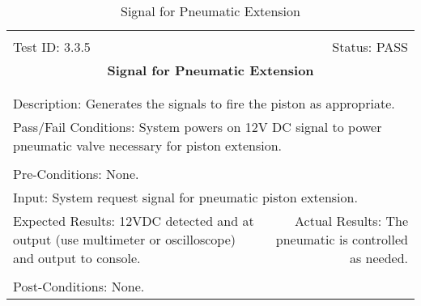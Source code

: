 \documentclass[titlepage]{article}
\begin{document}
\begin{center}
\begin{table}[h!]
\begin{tabular}{|l r|}\hline&\\[-2mm]
	Test ID: 3.3.5	&Status: PASS\\[-3mm]
	\multicolumn{2}{|c|}{\textbf{\large{Signal for Pneumatic Extension}}}\\&\\\hline&\\[-3mm]
	\multicolumn{2}{|p{\textwidth}|}{Description: Generates the signals to fire the piston as appropriate.}\\\hline
	\multicolumn{2}{|p{\textwidth}|}{Pass/Fail Conditions: System powers on 12V DC signal to power pneumatic valve necessary for piston extension.}\\[1mm]\hline&\\[-3mm]
	\multicolumn{2}{|p{\textwidth}|}{Pre-Conditions: None.}\\[4mm]
	\multicolumn{2}{|p{\textwidth}|}{Input: System request signal for pneumatic piston extension.}\\[2mm]\hline
	\multicolumn{1}{|p{0.49\textwidth}}{Expected Results: 12VDC detected and at output (use multimeter or oscilloscope) and output to console.}	&\multicolumn{1}{|p{0.45\textwidth}|}{Actual Results: The pneumatic is controlled as needed.}\\\hline&\\[-3mm]
	\multicolumn{2}{|p{\textwidth}|}{Post-Conditions: None.}\\\hline
\end{tabular}
\caption{Signal for Pneumatic Extension}
\end{table}
\end{center}
\newpage
\end{document}
